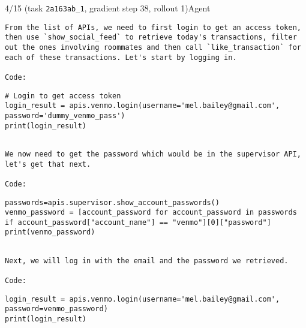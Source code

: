 \begin{minipage}{0.95\linewidth}
\begin{assistant_message_box}{{4/15 (task \texttt{2a163ab\_1}, gradient step 38, rollout 1)\hfill Agent}}
\scriptsize
\begin{Verbatim}[breaklines]
From the list of APIs, we need to first login to get an access token, then use `show_social_feed` to retrieve today's transactions, filter out the ones involving roommates and then call `like_transaction` for each of these transactions. Let's start by logging in.

Code:
\end{Verbatim}
\begin{tcolorbox}[colback=codebgcolor,boxrule=0pt]\begin{Verbatim}[breaklines]
# Login to get access token
login_result = apis.venmo.login(username='mel.bailey@gmail.com', password='dummy_venmo_pass')
print(login_result)

\end{Verbatim}
\end{tcolorbox}\begin{Verbatim}[breaklines]

We now need to get the password which would be in the supervisor API, let's get that next. 

Code:
\end{Verbatim}
\begin{tcolorbox}[colback=codebgcolor,boxrule=0pt]\begin{Verbatim}[breaklines]
passwords=apis.supervisor.show_account_passwords()
venmo_password = [account_password for account_password in passwords if account_password["account_name"] == "venmo"][0]["password"]
print(venmo_password)

\end{Verbatim}
\end{tcolorbox}\begin{Verbatim}[breaklines]

Next, we will log in with the email and the password we retrieved.
 
Code:
\end{Verbatim}
\begin{tcolorbox}[colback=codebgcolor,boxrule=0pt]\begin{Verbatim}[breaklines]
login_result = apis.venmo.login(username='mel.bailey@gmail.com', password=venmo_password)
print(login_result)

\end{Verbatim}
\end{tcolorbox}\begin{Verbatim}[breaklines]


\end{Verbatim}
\end{assistant_message_box}
\end{minipage}
